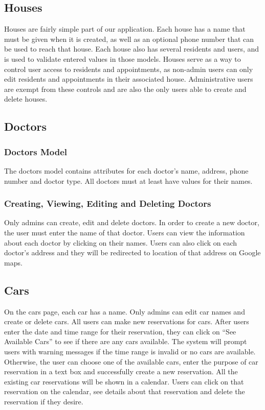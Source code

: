 \documentclass{sig-alternate}
\begin{document}
\subsection{Houses}
Houses are fairly simple part of our application. Each house has a name that must be given when it is created, as well as an optional phone number that can be used to reach that house. Each house also has several residents and users, and is used to validate entered values in those models. Houses serve as a way to control user access to residents and appointments, as non-admin users can only edit residents and appointments in their associated house. Administrative users are exempt from these controls and are also the only users able to create and delete houses.

\subsection{Doctors}

\subsubsection{Doctors Model}
The doctors model contains attributes for each doctor’s name, address, phone number and doctor type. All doctors must at least have values for their names. 

\subsubsection{Creating, Viewing, Editing and Deleting Doctors}
Only admins can create, edit and delete doctors. In order to create a new doctor, the user must enter the name of that doctor. Users can view the information about each doctor by clicking on their names. Users can also click on each doctor’s address and they will be redirected to location of that address on Google maps. 

\subsection{Cars}
On the cars page, each car has a name. Only admins can edit car names and create or delete cars. All users can make new reservations for cars. After users enter the date and time range for their reservation, they can click on “See Available Cars” to see if there are any cars available. The system will prompt users with warning messages if the time range is invalid or no cars are available. Otherwise, the user can choose one of the available cars, enter the purpose of car reservation in a text box and successfully create a new reservation. All the existing car reservations will be shown in a calendar. Users can click on that reservation on the calendar, see details about that reservation and delete the reservation if they desire. 
\end{document}

